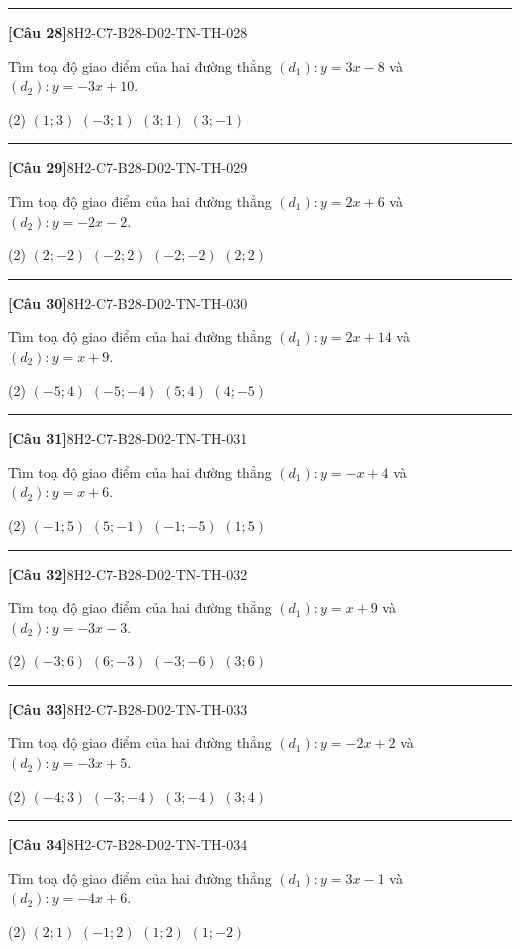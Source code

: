 \documentclass[12pt,a4paper]{article}
\newif\ifloigiai
\newenvironment{cauhoi}[2]{%
  \par\medskip\noindent\rule{\textwidth}{0.4pt}\par\nopagebreak
  \noindent\textbf{[#1]}\hfill{\scriptsize\ttfamily #2}\par\nopagebreak\smallskip}{\par}
\newcommand{\dapan}[1]{\ifloigiai\par\smallskip\noindent\textit{Đáp án:} \textbf{#1}\par\fi}
\begin{document}
\begin{cauhoi}{Câu 28}{8H2-C7-B28-D02-TN-TH-028}
Tìm toạ độ giao điểm của hai đường thẳng $(d_1): y=3x-8$ và $(d_2): y=-3x+10$.
\begin{tasks}(2)
\task $(1;3)$
\task $(-3;1)$
\task $(3;1)$
\task $(3;-1)$
\end{tasks}
\dapan{C}
\end{cauhoi}
\begin{cauhoi}{Câu 29}{8H2-C7-B28-D02-TN-TH-029}
Tìm toạ độ giao điểm của hai đường thẳng $(d_1): y=2x+6$ và $(d_2): y=-2x-2$.
\begin{tasks}(2)
\task $(2;-2)$
\task $(-2;2)$
\task $(-2;-2)$
\task $(2;2)$
\end{tasks}
\dapan{B}
\end{cauhoi}
\begin{cauhoi}{Câu 30}{8H2-C7-B28-D02-TN-TH-030}
Tìm toạ độ giao điểm của hai đường thẳng $(d_1): y=2x+14$ và $(d_2): y=x+9$.
\begin{tasks}(2)
\task $(-5;4)$
\task $(-5;-4)$
\task $(5;4)$
\task $(4;-5)$
\end{tasks}
\dapan{A}
\end{cauhoi}
\begin{cauhoi}{Câu 31}{8H2-C7-B28-D02-TN-TH-031}
Tìm toạ độ giao điểm của hai đường thẳng $(d_1): y=-x+4$ và $(d_2): y=x+6$.
\begin{tasks}(2)
\task $(-1;5)$
\task $(5;-1)$
\task $(-1;-5)$
\task $(1;5)$
\end{tasks}
\dapan{A}
\end{cauhoi}
\begin{cauhoi}{Câu 32}{8H2-C7-B28-D02-TN-TH-032}
Tìm toạ độ giao điểm của hai đường thẳng $(d_1): y=x+9$ và $(d_2): y=-3x-3$.
\begin{tasks}(2)
\task $(-3;6)$
\task $(6;-3)$
\task $(-3;-6)$
\task $(3;6)$
\end{tasks}
\dapan{A}
\end{cauhoi}
\begin{cauhoi}{Câu 33}{8H2-C7-B28-D02-TN-TH-033}
Tìm toạ độ giao điểm của hai đường thẳng $(d_1): y=-2x+2$ và $(d_2): y=-3x+5$.
\begin{tasks}(2)
\task $(-4;3)$
\task $(-3;-4)$
\task $(3;-4)$
\task $(3;4)$
\end{tasks}
\dapan{C}
\end{cauhoi}
\begin{cauhoi}{Câu 34}{8H2-C7-B28-D02-TN-TH-034}
Tìm toạ độ giao điểm của hai đường thẳng $(d_1): y=3x-1$ và $(d_2): y=-4x+6$.
\begin{tasks}(2)
\task $(2;1)$
\task $(-1;2)$
\task $(1;2)$
\task $(1;-2)$
\end{tasks}
\dapan{C}
\end{cauhoi}
\end{document}
